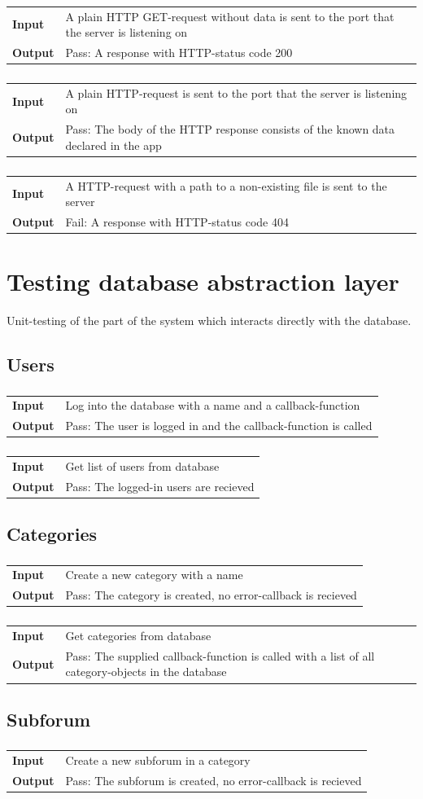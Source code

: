 \documentclass[a4paper, 12pt, titlepage]{article}
\newcommand{\testcase}[2]{
	\subsubsection{}
	\begin{tabular}{l p{11cm}}
	\bf{Input} & 
		#1\\
	\bf{Output} & 
		#2\\
	\end{tabular}
}
\begin{document}
		\testcase
		{
			A plain HTTP GET-request without data is sent to the port that the server is listening on
		}{
			Pass: A response with HTTP-status code 200
		}

		\testcase
		{
			A plain HTTP-request is sent to the port that the server is listening on
		}{
			Pass: The body of the HTTP response consists of the known data declared in the app
		}

		\testcase
		{
			A HTTP-request with a path to a non-existing file is sent to the server
		}{
			Fail:  A response with HTTP-status code 404
		}

	\section{Testing database abstraction layer}
	Unit-testing of the part of the system which interacts directly with the database.

	\subsection{Users}

		\testcase
		{
			Log into the database with a name and a callback-function
		}{
			Pass: The user is logged in and the callback-function is called
		}

		\testcase
		{
			Get list of users from database
		}{
			Pass: The logged-in users are recieved
		}

	\subsection{Categories}

		\testcase
		{
			Create a new category with a name 
		}{
			Pass: The category is created, no error-callback is recieved
		}

		\testcase
		{
			Get categories from database
		}{
			Pass: The supplied callback-function is called with a list of all category-objects in the database
		}

	\subsection{Subforum}

		\testcase
		{
			Create a new subforum in a category
		}{
			Pass: The subforum is created, no error-callback is recieved
		}
\end{document}
